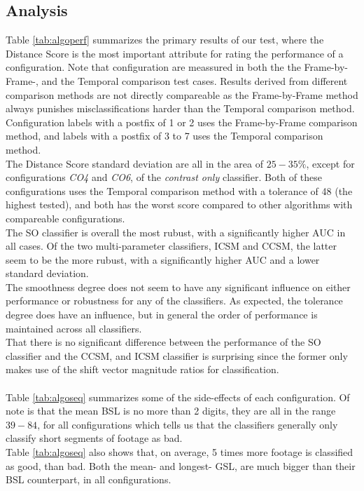 \subsection{Analysis}
%
Table \ref{tab:algoperf} summarizes the primary results of our test, where the Distance Score is the most important attribute for rating the performance of a configuration. Note that configuration are meassured in both the the Frame-by-Frame-, and the Temporal comparison test cases. Results derived from different comparison methods are not directly compareable as the Frame-by-Frame method always punishes misclassifications harder than the Temporal comparison method. Configuration labels with a postfix of 1 or 2 uses the Frame-by-Frame comparison method, and labels with a postfix of 3 to 7 uses the Temporal comparison method.\\
The Distance Score standard deviation are all in the area of $25-35\%$, except for configurations \textit{CO4} and \textit{CO6}, of the \textit{contrast only} classifier. Both of these configurations uses the Temporal comparison method with a tolerance of 48 (the highest tested), and both has the worst score compared to other algorithms with compareable configurations.\\
The SO classifier is overall the most rubust, with a significantly higher AUC in all cases. Of the two multi-parameter classifiers, ICSM and CCSM, the latter seem to be the more rubust, with a significantly higher AUC and a lower standard deviation.\\
The smoothness degree does not seem to have any significant influence on either performance or robustness for any of the classifiers. As expected, the tolerance degree does have an influence, but in general the order of performance is maintained across all classifiers.\\
That there is no significant difference between the performance of the SO classifier and the CCSM, and ICSM classifier is surprising since the former only makes use of the shift vector magnitude ratios for classification.\\
\\
Table \ref{tab:algoseq} summarizes some of the side-effects of each configuration. Of note is that the mean BSL is no more than 2 digits, they are all in the range $39-84$, for all configurations which tells us that the classifiers generally only classify short segments of footage as bad.\\
Table \ref{tab:algoseq} also shows that, on average, 5 times more footage is classified as good, than bad. Both the mean- and longest- GSL, are much bigger than their BSL counterpart, in all configurations.
%
